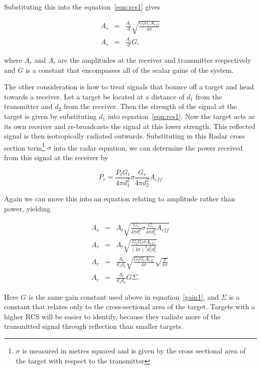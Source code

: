 \documentclass[12pt,openany,a4paper]{book}
\begin{document}
\bigskip

Substituting this into the equation~\ref{eqn:rcs1} gives

\begin{eqnarray}
A_r &=& \frac{A_t}{d} \sqrt{\frac{G_tG_rA_{eff}}{4\pi}} \\
\label{gain1}
A_r &=& \frac{A_t}{d} G,
\end{eqnarray}

\bigskip

where $A_r$ and $A_t$ are the amplitudes at the receiver and transmitter respectively and $G$ is a constant that encompasses all of the scalar gains of the system.

\bigskip

The other consideration is how to treat signals that bounce off a target and head towards a receiver. Let a target be located at a distance of $d_1$ from the transmitter and $d_2$ from the receiver. Then the strength of the signal at the target is given by substituting $d_1$ into equation~\ref{eqn:rcs1}. Now the target acts as its own receiver and re-broadcasts the signal at this lower strength. This reflected signal is then isotropically radiated outwards. Substituting in this Radar cross section term\footnote{$\sigma$ is measured in metres squared and is given by the cross sectional area of the target with respect to the transmitter} $\sigma$ into the radar equation, we can determine the power received from this signal at the receiver by

\begin{equation}
\label{eqn:rcs2}
P_r = \frac{P_tG_t}{4\pi d_1^2} \sigma \frac{G_r}{4\pi d_2^2}A_{eff}
\end{equation}

\bigskip

Again we can move this into an equation relating to amplitude rather than power, yielding

\begin{eqnarray}
A_r &=& A_t \sqrt{\frac{G_t}{4\pi d_1^2} \sigma \frac{G_r}{4\pi d_2^2}A_{eff}} \\
A_r &=& A_t \sqrt{\frac{G_tG_r\sigma A_{eff}}{(4\pi)^2d_1^2d_2^2}} \\
A_r &=& \frac{A_t}{d_1d_2} \sqrt{\frac{G_tG_r A_{eff}}{4\pi}} \sqrt{\frac{\sigma}{4\pi}} \\
A_r &=& \frac{A_t}{d_1d_2} G \Sigma.
\end{eqnarray}

\bigskip

Here $G$ is the same gain constant used above in equation~\ref{gain1}, and $\Sigma$ is a constant that relates only to the cross-sectional area of the target. Targets with a higher RCS will be easier to identify, because they radiate more of the transmitted signal through reflection than smaller targets.
\end{document}
